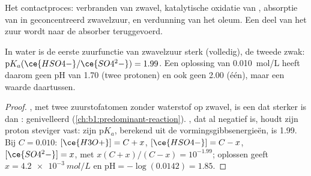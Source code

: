 \begin{omfigure}

{\small Het contactproces: verbranden van zwavel, katalytische oxidatie
van , absorptie van  in geconcentreerd zwavelzuur, en
verdunning van het oleum. Een deel van het zuur wordt naar de absorber
teruggevoerd.}
\end{omfigure}

\begin{proposition}\label{prop:b1:p-block-16-18:sulfuric-strength}
In water is de eerste zuurfunctie van zwavelzuur sterk (volledig), de
tweede zwak: $\mathrm{p}K_a(\ce{HSO4-}/\ce{SO4^2-}) = 1.99$. Een oplossing
van \qty{0.010}{mol/L} heeft daarom geen pH van 1.70 (twee protonen) en
ook geen 2.00 (één), maar een waarde daartussen.
\end{proposition}

\begin{proof}
, met twee zuurstofatomen zonder waterstof op zwavel, is een
 dat sterker is dan : genivelleerd
(\cref{ch:b1:predominant-reaction}). , dat al negatief is, houdt
zijn proton steviger vast: zijn $\mathrm{p}K_a$, berekend uit de
vormingsgibbsenergieën, is 1.99. Bij $C = 0.010$:
$[\ce{H3O+}] = C + x$, $[\ce{HSO4-}] = C - x$, $[\ce{SO4^2-}] = x$, met
$x(C + x)/(C - x) = 10^{-1.99}$; oplossen geeft $x = \qty{4.2e-3}{mol/L}$
en $\mathrm{pH} = -\log(0.0142) = 1.85$.
\end{proof}

